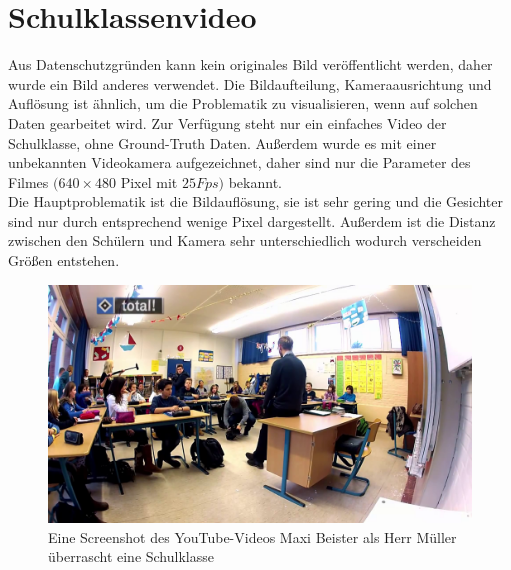 \section{Schulklassenvideo}
\label{Schulvideo}
Aus Datenschutzgründen kann kein originales Bild veröffentlicht werden, daher wurde ein Bild anderes verwendet. Die Bildaufteilung, Kameraausrichtung und Auflösung ist ähnlich, um die Problematik zu visualisieren, wenn auf solchen Daten gearbeitet wird. Zur Verfügung steht nur ein einfaches Video der Schulklasse, ohne Ground-Truth Daten. Außerdem wurde es mit einer unbekannten Videokamera aufgezeichnet, daher sind nur die Parameter des Filmes $(640 \times 480$ Pixel mit $25Fps)$ bekannt.\\
Die Hauptproblematik ist die Bildauflösung, sie ist sehr gering und die Gesichter sind nur durch entsprechend wenige Pixel dargestellt. Außerdem ist die Distanz zwischen den Schülern und Kamera sehr unterschiedlich wodurch verscheiden Größen entstehen.\\
\begin{figure}
	\centering
	\includegraphics[width=0.8\linewidth]{img/Schulklasse}
	\caption{Eine Screenshot des YouTube-Videos \glqq Maxi Beister als Herr Müller überrascht eine Schulklasse\grqq \cite{Schulklasse_Video}}
	\label{fig:schulklasse}
\end{figure}
